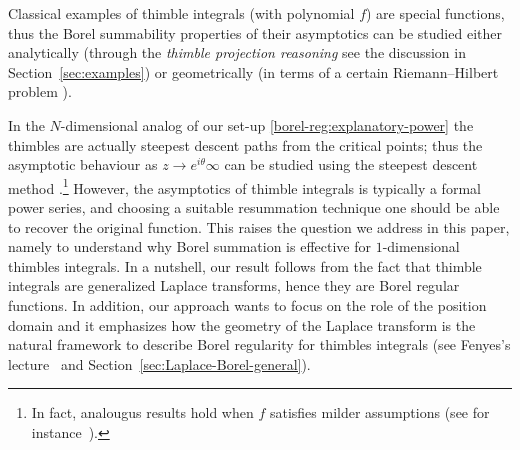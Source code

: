 \documentclass{article}
\theoremstyle{definition}
\theoremstyle{plain}
\begin{document}
Classical examples of thimble integrals (with polynomial $f$) are special functions, thus the Borel summability properties of their asymptotics can be studied either analytically (through the \textit{thimble projection reasoning} see the discussion in Section~\ref{sec:examples}) or geometrically (in terms of a certain Riemann--Hilbert problem \cite{Maxim_slide_ERC}\cite[Section 6.2]{kontsevich2022analyticity}). 


In the $N$-dimensional analog of our set-up \ref{borel-reg:explanatory-power} the thimbles are actually steepest descent paths from the critical points; thus the asymptotic behaviour as $z\to e^{i\theta}\infty$ can be studied using the steepest descent method \cite{andersen2020resurgence,delabaere-howls,delabaere_dillinger_pham,Delabaere-Pham99,dingle1973asymptotic,Malgrange22,Pham83}.\footnote{In fact, analougus results hold when $f$ satisfies milder assumptions (see for instance~\cite[Section 1.2.2]{mistegard_phdthesis}).} However, the asymptotics of thimble integrals is typically a formal power series, and choosing a suitable resummation technique one should be able to recover the original function. This raises the question we address in this paper, namely to understand why Borel summation is effective for $1$-dimensional thimbles integrals. In a nutshell, our result follows from the fact that thimble integrals are generalized Laplace transforms, hence they are Borel regular functions. In addition, our approach wants to focus on the role of the position domain and it emphasizes how the geometry of the Laplace transform is the natural framework to describe Borel regularity for thimbles integrals (see Fenyes's lecture~\cite{Fenyes-ihes-lecture} and Section~\ref{sec:Laplace-Borel-general}).   



%     
\end{document}
